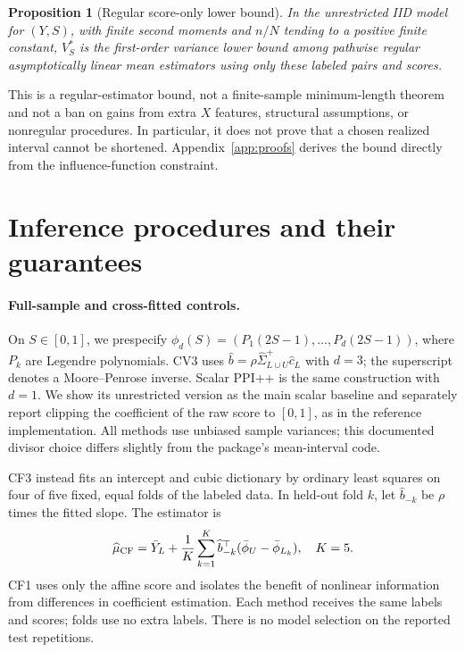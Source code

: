 \documentclass{article}
\newtheorem{proposition}{Proposition}
\begin{document}
\begin{proposition}[Regular score-only lower bound]
\label{prop:lower}
In the unrestricted IID model for $(Y,S)$, with finite second moments and $n/N$ tending to a positive finite constant, $V_S^*$ is the first-order variance lower bound among pathwise regular asymptotically linear mean estimators using only these labeled pairs and scores.
\end{proposition}
This is a regular-estimator bound, not a finite-sample minimum-length theorem and not a ban on gains from extra $X$ features, structural assumptions, or nonregular procedures. In particular, it does not prove that a chosen realized interval cannot be shortened. Appendix~\ref{app:proofs} derives the bound directly from the influence-function constraint.

\section{Inference procedures and their guarantees}
\label{sec:methods}
\paragraph{Full-sample and cross-fitted controls.}
On $S\in[0,1]$, we prespecify $\phi_d(S)=(P_1(2S-1),\ldots,P_d(2S-1))$, where $P_k$ are Legendre polynomials. CV3 uses $\widehat b=\rho\widehat\Sigma_{L\cup U}^{+}\widehat c_L$ with $d=3$; the superscript denotes a Moore--Penrose inverse. Scalar PPI++ is the same construction with $d=1$. We show its unrestricted version as the main scalar baseline and separately report clipping the coefficient of the raw score to $[0,1]$, as in the reference implementation. All methods use unbiased sample variances; this documented divisor choice differs slightly from the package's mean-interval code.

CF3 instead fits an intercept and cubic dictionary by ordinary least squares on four of five fixed, equal folds of the labeled data. In held-out fold $k$, let $\widehat b_{-k}$ be $\rho$ times the fitted slope. The estimator is
\begin{equation}
 \widehat\mu_{\rm CF}=\bar Y_L+\frac1K\sum_{k=1}^K
 \widehat b_{-k}^\top(\bar\phi_U-\bar\phi_{L_k}),\quad K=5.
 \label{eq:cf}
\end{equation}
CF1 uses only the affine score and isolates the benefit of nonlinear information from differences in coefficient estimation. Each method receives the same labels and scores; folds use no extra labels. There is no model selection on the reported test repetitions.
\end{document}
